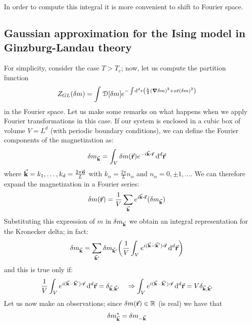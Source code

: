 \documentclass[../main/main.tex]{subfiles}
\begin{document}
In order to compute this integral it is more convenient to shift to Fourier space.




\subsection{Gaussian approximation for the Ising model in Ginzburg-Landau theory}
For simplicity, consider the case \( T>T_c \); now, let us compute the partition function
\begin{equation}
  Z_{GL} (\delta m) = \int_{}^{} \mathcal{D} \qty[\delta m] e^{- \int_{}^{} \dd[d]{r} \qty(\frac{k}{2} \qty(\grad \delta m)^2 + a t (\delta m)^2  )  }
 \end{equation}
 in the Fourier space.
 Let us make some remarks on what happens when we apply Fourier transformations in this case. If our system is enclosed in a cubic box of volume \( V = L^d \) (with periodic boundary conditions), we can define the Fourier components of the magnetization as:
 \begin{equation}
   \delta m_{\va{k}} = \int_{V}^{}  \delta m (\va{r}) e^{-i \va{k} \vdot \va{r} }\dd[d]{\va{r}}
 \end{equation}
 where \( \va{k} = k_1, \dots, k_d = \frac{2 \pi  \va{n} }{L}\) with \( k_ \alpha = \frac{2 \pi }{L} n_ \alpha  \) and \( n_ \alpha  = 0 , \pm 1, \dots \). We can therefore expand the magnetization in a Fourier series:
 \begin{equation}
   \delta m (\va{r}) = \frac{1}{V} \sum_{\va{k}}  e^{i \va{k}\vdot \va{r}} (\delta m_{\va{k}})
 \end{equation}
 Substituting this expression of \( m \) in \( \delta m_{\va{k}} \) we obtain an integral representation for the Kronecker delta; in fact:
 \begin{equation*}
   \delta m_{\va{k}} = \sum_{\va{k}'}^{}  \delta m_{\va{k}'} \qty( \frac{1}{V} \int_{V}^{} e^{i(\va{k}-\va{k}')\vdot \va{r}} \dd[d]{\va{r}}  )
 \end{equation*}
and this is true only if:
\begin{equation*}
  \frac{1}{V} \int_{V}^{} e^{i(\va{k}-\va{k}')\vdot \va{r}} \dd[d]{\va{r}} = \delta _{\va{k},\va{k}'} \quad \Rightarrow   \int_{V}^{} e^{i(\va{k}-\va{k}')\vdot \va{r}} \dd[d]{\va{r}} = V \delta _{\va{k},\va{k}'}
\end{equation*}
Let us now make an observations; since \( \delta m (\va{r}) \in \mathbb{R} \) (is real) we have that
\begin{equation*}
  \delta m^*_{\va{k}} =  \delta m_{-\va{k}}
\end{equation*}
\end{document}
